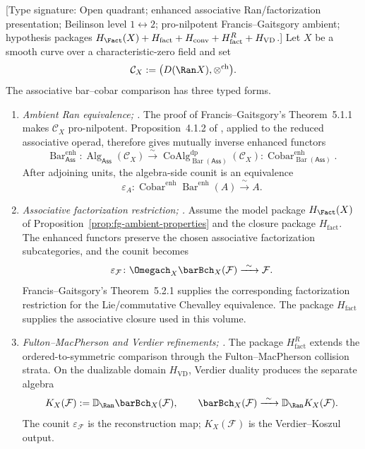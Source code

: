 \begin{theorem}
\label{thm:fg-factorization-bar-cobar}
\textup{[Type signature: Open quadrant; enhanced associative
Ran/factorization presentation; Beilinson level $1\leftrightarrow2$;
pro-nilpotent Francis--Gaitsgory ambient; hypothesis packages
$H_{\Fact}(X)+H_{\mathrm{fact}}+H_{\mathrm{conv}}+
H_{\mathrm{fact}}^{R}+H_{\mathrm{VD}}$.]}
Let $X$ be a smooth curve over a characteristic-zero field and set
\[
 \mathcal C_X:=\bigl(D(\Ran X),\otimes^{\mathrm{ch}}\bigr).
\]
The associative bar--cobar comparison has three typed forms.
\begin{enumerate}[label=\textup{(\roman*)}]
\item \emph{Ambient Ran equivalence; \ClaimStatusProvedElsewhere.}
The proof of Francis--Gaitsgory's Theorem~5.1.1 makes
$\mathcal C_X$ pro-nilpotent.  Proposition~4.1.2 of
\cite{FrancisGaitsgory2012}, applied to the reduced associative
operad, therefore gives mutually inverse enhanced functors
\[
 \operatorname{Bar}^{\mathrm{enh}}_{\mathsf{Ass}}\colon
 \operatorname{Alg}_{\mathsf{Ass}}(\mathcal C_X)
 \xrightarrow{\ \sim\ }
 \operatorname{CoAlg}^{\mathrm{dp}}_{\operatorname{Bar}(\mathsf{Ass})}
 (\mathcal C_X)
 \mathbin{:}
 \operatorname{Cobar}^{\mathrm{enh}}_{\operatorname{Bar}(\mathsf{Ass})}.
\]
After adjoining units, the algebra-side counit is an equivalence
\[
 \varepsilon_A\colon
 \operatorname{Cobar}^{\mathrm{enh}}
 \operatorname{Bar}^{\mathrm{enh}}(A)
 \xrightarrow{\ \sim\ } A .
\]

\item \emph{Associative factorization restriction;
\ClaimStatusConditional.}
Assume the model package $H_{\Fact}(X)$ of
Proposition~\ref{prop:fg-ambient-properties} and the closure package
$H_{\mathrm{fact}}$.  The enhanced functors preserve the chosen
associative factorization subcategories, and the counit becomes
\[
 \varepsilon_{\mathcal F}\colon
 \Omegach_X\barBch_X(\mathcal F)
 \xrightarrow{\ \sim\ }\mathcal F .
\]
Francis--Gaitsgory's Theorem~5.2.1 supplies the corresponding
factorization restriction for the Lie/commutative Chevalley
equivalence.  The package $H_{\mathrm{fact}}$ supplies the associative
closure used in this volume.

\item \emph{Fulton--MacPherson and Verdier refinements;
\ClaimStatusConditional.}
The package $H_{\mathrm{fact}}^{R}$ extends the ordered-to-symmetric
comparison through the Fulton--MacPherson collision strata.  On the
dualizable domain $H_{\mathrm{VD}}$, Verdier duality produces the
separate algebra
\[
 K_X(\mathcal F):=\mathbb D_{\Ran}\barBch_X(\mathcal F),
 \qquad
 \barBch_X(\mathcal F)
 \xrightarrow{\ \sim\ }
 \mathbb D_{\Ran}K_X(\mathcal F).
\]
The counit $\varepsilon_{\mathcal F}$ is the reconstruction map;
$K_X(\mathcal F)$ is the Verdier--Koszul output.
\end{enumerate}
\end{theorem}

